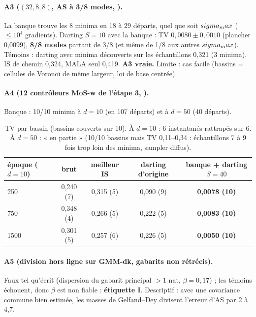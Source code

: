 \paragraph{A3 ($(32,8,8)$, AS à 3/8 modes, ).} La banque trouve les 8 minima en 18 à 29 départs, quel que soit $sigma_max$ ($\le10^4$ gradients). Darting $S=10$ avec la banque : TV $0{,}0080\pm0{,}0010$ (plancher 0,0099), \textbf{8/8 modes} partant de 3/8 (et même de 1/8 aux autres $sigma_max$). Témoins : darting avec minima découverts sur les échantillons 0,321 (3 minima), IS de chemin 0,324, MALA seul 0,419. \textbf{A3 vraie.} Limite : cas facile (bassins = cellules de Voronoï de même largeur, loi de base centrée).
\paragraph{A4 (12 contrôleurs MoS-w de l'étape 3, ).} Banque : 10/10 minima à $d=10$ (en 107 départs) et à $d=50$ (40 départs).
\begin{table}[h]\centering\small
\begin{tabular}{lcccc}\toprule
époque ($d=10$) & brut & meilleur IS & darting d'origine & \textbf{banque + darting} $S=40$\\\midrule
250 & 0,240 (7) & 0,315 (5) & 0,090 (9) & \textbf{0,0078 (10)}\\
750 & 0,348 (4) & 0,266 (5) & 0,222 (5) & \textbf{0,0083 (10)}\\
1500 & 0,301 (5) & 0,257 (6) & 0,226 (5) & \textbf{0,0050 (10)}\\\bottomrule
\end{tabular}
\caption{TV par bassin (bassins couverts sur 10). À $d=10$ : 6 instantanés rattrapés sur 6. À $d=50$ : « en partie » (10/10 bassins mais TV 0,11--0,34 : échantillons 7 à 9 fois trop loin des minima, sampler diffus).}
\end{table}
\paragraph{A5 (division hors ligne sur GMM-dk, gabarits non rétrécis).} Faux tel qu'écrit (dispersion du gabarit principal $>1$ nat, $\beta=0{,}17$) ; les témoins échouent, donc $\beta$ est non fiable : \textbf{étiquette I}. Descriptif : avec une covariance commune bien estimée, les masses de Gelfand--Dey divisent l'erreur d'AS par 2 à 4,7.

